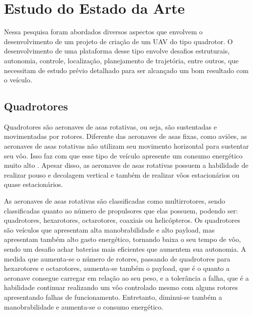 \chapter{Estudo do Estado da Arte}
\label{chap:metod}
Nessa pesquisa foram abordados diversos aspectos que envolvem o desenvolvimento de um projeto de criação de um UAV do tipo quadrotor. O desenvolvimento de uma plataforma desse tipo envolve desafios estruturais, autonomia, controle, localização, planejamento de trajetória, entre outros, que necessitam de estudo prévio detalhado para ser alcançado um bom resultado com o veículo.

\section{Quadrotores}
Quadrotores são aeronaves de asas rotativas, ou seja, são sustentadas e movimentadas por rotores. Diferente das aeronaves de asas fixas, como aviões, as aeronaves de asas rotativas não utilizam seu movimento horizontal para sustentar seu vôo. Isso faz com que esse tipo de veículo apresente um consumo energético muito alto \cite{karydis2017energetics}. Apesar disso, as aeronaves de asas rotativas possuem a habilidade de realizar pouso e decolagem vertical e também de realizar vôos estacionários ou quase estacionários.

As aeronaves de asas rotativas são classificadas como multirrotores, sendo classificadas quanto ao número de propulsores que elas possuem, podendo ser: quadrotores, hexarotores, octarotores, coaxiais ou helicópteros. Os quadrotores são veículos que apresentam alta manobrabilidade e alto payload, mas apresentam também alto gasto energético, tornando baixa o seu tempo de vôo, sendo um desafio achar baterias mais eficientes que aumentem sua autonomia. A medida que aumenta-se o número de rotores, passando de quadrotores para hexarotores e octarotores, aumenta-se também o payload, que é o quanto a aeronave consegue carregar em relação ao seu peso, e a tolerância a falha, que é a habilidade continuar realizando um vôo controlado mesmo com alguns rotores apresentando falhas de funcionamento. Entretanto, diminui-se também a manobrabilidade e aumenta-se o consumo energético.

